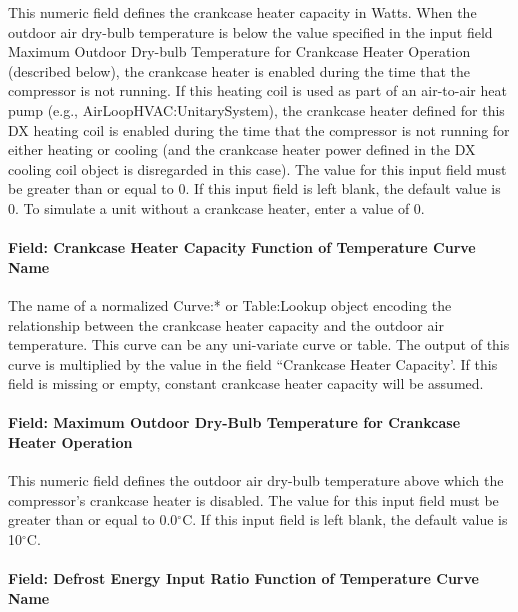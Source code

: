 This numeric field defines the crankcase heater capacity in Watts. When the outdoor air dry-bulb temperature is below the value specified in the input field Maximum Outdoor Dry-bulb Temperature for Crankcase Heater Operation (described below), the crankcase heater is enabled during the time that the compressor is not running. If this heating coil is used as part of an air-to-air heat pump (e.g., AirLoopHVAC:UnitarySystem), the crankcase heater defined for this DX heating coil is enabled during the time that the compressor is not running for either heating or cooling (and the crankcase heater power defined in the DX cooling coil object is disregarded in this case). The value for this input field must be greater than or equal to 0. If this input field is left blank, the default value is 0. To simulate a unit without a crankcase heater, enter a value of 0.

\paragraph{Field: Crankcase Heater Capacity Function of Temperature Curve Name}

The name of a normalized Curve:* or Table:Lookup object encoding the relationship between the crankcase heater capacity and the outdoor air temperature. This curve can be any uni-variate curve or table. The output of this curve is multiplied by the value in the field ``Crankcase Heater Capacity'. If this field is missing or empty, constant crankcase heater capacity will be
assumed.

\paragraph{Field: Maximum Outdoor Dry-Bulb Temperature for Crankcase Heater Operation}\label{field-maximum-outdoor-dry-bulb-temperature-for-crankcase-heater-operation-5}

This numeric field defines the outdoor air dry-bulb temperature above which the compressor's crankcase heater is disabled. The value for this input field must be greater than or equal to 0.0$^\circ$C. If this input field is left blank, the default value is 10$^\circ$C.

\paragraph{Field: Defrost Energy Input Ratio Function of Temperature Curve Name}\label{field-defrost-energy-input-ratio-function-of-temperature-curve-name-1}

